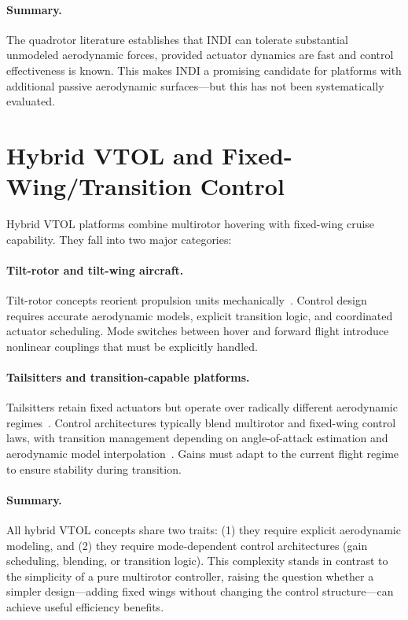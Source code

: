 \paragraph{Summary.}
The quadrotor literature establishes that INDI can tolerate substantial unmodeled aerodynamic forces, provided actuator dynamics are fast and control effectiveness is known. This makes INDI a promising candidate for platforms with additional passive aerodynamic surfaces---but this has not been systematically evaluated.

\section{Hybrid VTOL and Fixed-Wing/Transition Control}

Hybrid VTOL platforms combine multirotor hovering with fixed-wing cruise capability. They fall into two major categories:

\paragraph{Tilt-rotor and tilt-wing aircraft.}
Tilt-rotor concepts reorient propulsion units mechanically~\cite{Bauersfeld2021}. Control design requires accurate aerodynamic models, explicit transition logic, and coordinated actuator scheduling. Mode switches between hover and forward flight introduce nonlinear couplings that must be explicitly handled.

\paragraph{Tailsitters and transition-capable platforms.}
Tailsitters retain fixed actuators but operate over radically different aerodynamic regimes~\cite{Oosedo2017,Tal2022Global}. Control architectures typically blend multirotor and fixed-wing control laws, with transition management depending on angle-of-attack estimation and aerodynamic model interpolation~\cite{DaudFilho2024}. Gains must adapt to the current flight regime to ensure stability during transition.

\paragraph{Summary.}
All hybrid VTOL concepts share two traits:
(1) they require explicit aerodynamic modeling, and
(2) they require mode-dependent control architectures (gain scheduling, blending, or transition logic).
This complexity stands in contrast to the simplicity of a pure multirotor controller, raising the question whether a simpler design---adding fixed wings without changing the control structure---can achieve useful efficiency benefits.

